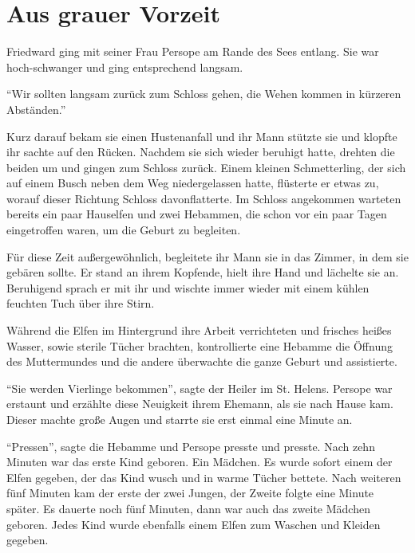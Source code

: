 \chapter{Aus grauer Vorzeit}




Friedward ging mit seiner Frau Persope am Rande des Sees entlang. Sie war hoch-schwanger und ging entsprechend langsam.

\enquote{Wir sollten langsam zurück zum Schloss gehen, die Wehen kommen in kürzeren Abständen.}

Kurz darauf bekam sie einen Hustenanfall und ihr Mann stützte sie und klopfte ihr sachte auf den Rücken. Nachdem sie sich wieder beruhigt hatte, drehten die beiden um und gingen zum Schloss zurück. Einem kleinen Schmetterling, der sich auf einem Busch neben dem Weg niedergelassen hatte, flüsterte er etwas zu, worauf dieser Richtung Schloss davonflatterte. Im Schloss angekommen warteten bereits ein paar Hauselfen und zwei Hebammen, die schon vor ein paar Tagen eingetroffen waren, um die Geburt zu begleiten.

Für diese Zeit außergewöhnlich, begleitete ihr Mann sie in das Zimmer, in dem sie gebären sollte. Er stand an ihrem Kopfende, hielt ihre Hand und lächelte sie an. Beruhigend sprach er mit ihr und wischte immer wieder mit einem kühlen feuchten Tuch über ihre Stirn.

Während die Elfen im Hintergrund ihre Arbeit verrichteten und frisches heißes Wasser, sowie sterile Tücher brachten, kontrollierte eine Hebamme die Öffnung des Muttermundes und die andere überwachte die ganze Geburt und assistierte.

\begin{rueckblick}
\enquote{Sie werden Vierlinge bekommen}, sagte der Heiler im St. Helens. Persope war erstaunt und erzählte diese Neuigkeit ihrem Ehemann, als sie nach Hause kam. Dieser machte große Augen und starrte sie erst einmal eine Minute an.
\end{rueckblick}

\enquote{Pressen}, sagte die Hebamme und Persope presste und presste. Nach zehn Minuten war das erste Kind geboren. Ein Mädchen. Es wurde sofort einem der Elfen gegeben, der das Kind wusch und in warme Tücher bettete. Nach weiteren fünf Minuten kam der erste der zwei Jungen, der Zweite folgte eine Minute später. Es dauerte noch fünf Minuten, dann war auch das zweite Mädchen geboren. Jedes Kind wurde ebenfalls einem Elfen zum Waschen und Kleiden gegeben.

